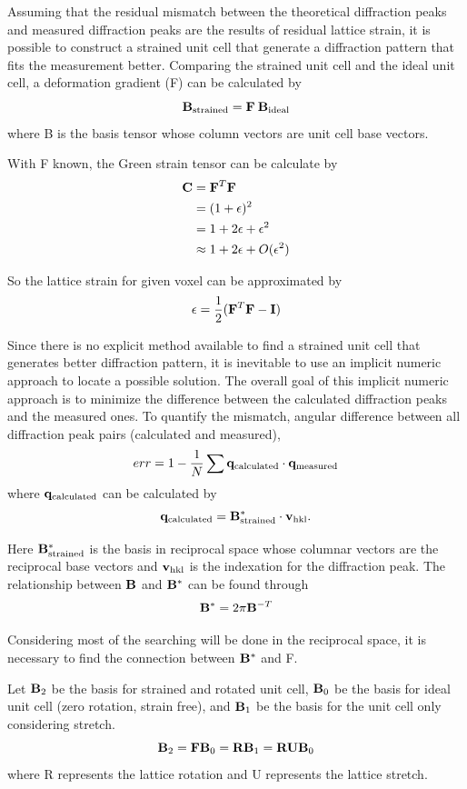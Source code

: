 \documentclass[12pt]{scrartcl}
\begin{document}
\begin{enumerate}
Assuming that the residual mismatch between the theoretical diffraction peaks and measured diffraction peaks are the results of residual lattice strain, it is possible to construct a strained unit cell that generate a diffraction pattern that fits the measurement better.
Comparing the strained unit cell and the ideal unit cell, a deformation gradient (\tnsr F) can be calculated by
\[
	\mathbf{B}_\text{strained} = \mathbf{F} \: \mathbf{B}_\text{ideal}
\]
where \tnsr B is the basis tensor whose column vectors are unit cell base vectors.

With \tnsr F known, the Green strain tensor can be calculate by
\begin{align*}
	\mathbf{C} &= \mathbf{F}^T \mathbf{F} \\
	            &= (1 + \mathbf{\epsilon})^2 \\
	            &= 1 + 2\epsilon + \epsilon^2 \\
	            &\approx 1 + 2\epsilon + O(\epsilon^2)
\end{align*}

So the lattice strain for given voxel can be approximated by
\[
	\epsilon = \dfrac{1}{2} (\mathbf{F}^T\mathbf{F} - \mathbf{I})
\]

Since there is no explicit method available to find a strained unit cell that generates better diffraction pattern, it is inevitable to use an implicit numeric approach to locate a possible solution.
The overall goal of this implicit numeric approach is to minimize the difference between the calculated diffraction peaks and the measured ones.
To quantify the mismatch, angular difference between all diffraction peak pairs (calculated and measured),
\[
	err = 1 - \dfrac{1}{N} \sum \mathbf{q}_\text{calculated} \cdot \mathbf{q}_\text{measured}
\]
where $\mathbf{q}_\text{calculated}$ can be calculated by
\[
	\mathbf{q}_\text{calculated} = \mathbf{B}^*_\text{strained} \cdot \mathbf{v}_\text{hkl}.
\]

Here $\mathbf{B}^*_\text{strained}$ is the basis in reciprocal space whose columnar vectors are the reciprocal base vectors and $\mathbf{v}_\text{hkl}$ is the indexation for the diffraction peak.
The relationship between $\mathbf{B}$ and $\mathbf{B}^*$ can be found through
\[
	\mathbf{B}^* = 2 \pi \mathbf{B}^{-T}
\]

Considering most of the searching will be done in the reciprocal space, it is necessary to find the connection between $\mathbf{B}^*$ and \tnsr F.

Let $\mathbf{B}_2$ be the basis for strained and rotated unit cell, $\mathbf{B}_0$ be the basis for ideal unit cell (zero rotation, strain free), and $\mathbf{B}_1$ be the basis for the unit cell only considering stretch.
\[
	\mathbf{B}_2 = \mathbf{F} \mathbf{B}_0 = \mathbf{R} \mathbf{B}_1 = \mathbf{R} \mathbf{U} \mathbf{B}_0
\]
where \tnsr R represents the lattice rotation and \tnsr U represents the lattice stretch.


\end{enumerate}
\end{document}
